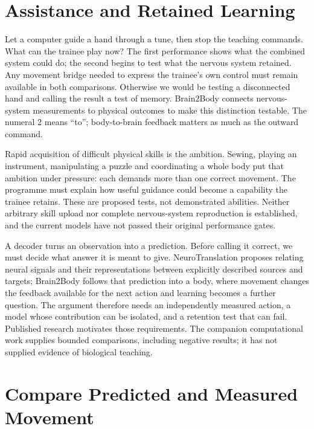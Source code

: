 

\section{Assistance and Retained Learning}

Let a computer guide a hand through a tune, then stop the teaching commands.
What can the trainee play now? The first performance shows what the combined
system could do; the second begins to test what the nervous system retained.
Any movement bridge needed to express the trainee's own control must remain
available in both comparisons. Otherwise we would be testing a disconnected
hand and calling the result a test of memory. Brain2Body connects
nervous-system measurements to physical outcomes to make this distinction
testable. The numeral 2 means ``to''; body-to-brain feedback matters as much
as the outward command.\par

Rapid acquisition of difficult physical skills is the ambition. Sewing, playing an instrument, manipulating a puzzle and coordinating a whole body put that ambition under pressure: each demands more than one correct movement. The programme must explain how useful guidance could become a capability the trainee retains. These are proposed tests, not demonstrated abilities. Neither arbitrary skill upload nor complete nervous-system reproduction is established, and the current models have not passed their original performance gates.\par

A decoder turns an observation into a prediction. Before calling it correct, we must decide what answer it is meant to give. NeuroTranslation proposes relating neural signals and their representations between explicitly described sources and targets; Brain2Body follows that prediction into a body, where movement changes the feedback available for the next action and learning becomes a further question. The argument therefore needs an independently measured action, a model whose contribution can be isolated, and a retention test that can fail. Published research motivates those requirements. The companion computational work supplies bounded comparisons, including negative results; it has not supplied evidence of biological teaching.\par

\section{Compare Predicted and Measured Movement}

